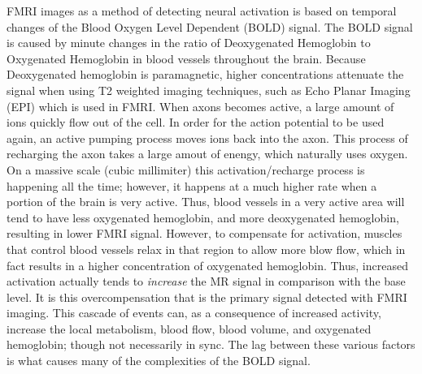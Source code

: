 \documentclass{article}
\begin{document}
FMRI images as a method of detecting neural activation is based on 
temporal changes of the Blood Oxygen Level Dependent (BOLD) signal.
The BOLD signal is caused by minute changes in the ratio of Deoxygenated
Hemoglobin to Oxygenated Hemoglobin in blood vessels throughout the brain.
Because Deoxygenated hemoglobin is paramagnetic, higher concentrations
attenuate the signal when using T2 weighted imaging techniques, such 
as Echo Planar Imaging (EPI) which is used in FMRI. When axons becomes active,
a large amount of ions quickly flow out of the cell. In order for the action
potential to be used again, an active pumping process moves ions back into the
axon. This process of recharging the axon takes a large amout of enengy, which 
naturally uses oxygen. On a massive scale (cubic millimiter) this activation/recharge
process is happening all
the time; however, it happens at a much higher rate when a portion of
the brain is very active. Thus, blood vessels in a very active area will 
tend to have less oxygenated hemoglobin, and more deoxygenated hemoglobin,
resulting in lower FMRI signal. However, to compensate for activation, muscles that
control blood vessels relax in that region to allow more blow flow, which 
in fact results in a higher concentration of oxygenated hemoglobin. Thus,
increased activation actually tends to \emph{increase} the MR signal in
comparison with the base level. It is this overcompensation that is the 
primary signal detected with FMRI imaging. This cascade of events
can, as a consequence of increased activity, increase the local metabolism, 
blood flow, blood volume, and oxygenated hemoglobin; though not necessarily
in sync. The lag between these
various factors is what causes many of the complexities of the BOLD signal.
\end{document}
